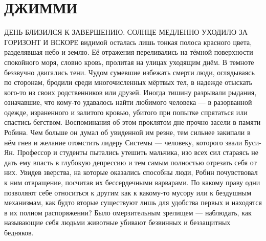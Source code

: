 \documentclass[a4paper,12pt]{book}
\begin{document}
\chapter{ДЖИММИ}
	ДЕНЬ БЛИЗИЛСЯ К ЗАВЕРШЕНИЮ. СОЛНЦЕ МЕДЛЕННО УХОДИЛО ЗА ГОРИЗОНТ И ВСКОРЕ видимой осталась лишь тонкая полоса красного цвета, разделявшая небо и землю. Её отражения переливались на тёмной поверхности спокойного моря, словно кровь, пролитая на улицах уходящим днём.
	В темноте беззвучно двигались тени. Чудом сумевшие избежать смерти люди, оглядываясь по сторонам, бродили среди многочисленных мёртвых тел, в надежде отыскать кого-то из своих родственников или друзей. Иногда тишину разрывали рыдания, означавшие, что кому-то удавалось найти любимого человека — в разорванной одежде, израненного и залитого кровью, убитого при попытке спрятаться или спастись бегством.
	Воспоминания об этом проклятом дне прочно засели в памяти Робина. Чем больше он думал об увиденной им резне, тем сильнее закипали в нём гнев и желание отомстить лидеру Системы — человеку, которого звали Буси-Ян.
	Профессор и студенты пытались утешить мальчика, изо всех сил стараясь не дать ему впасть в глубокую депрессию и тем самым полностью отрезать себя от них.
	Увидев зверства, на которые оказались способны люди, Робин почувствовал к ним отвращение, посчитав их бессердечными варварами. По какому праву одни позволяют себе относиться к другим как к какому-то мусору или к бездушным механизмам, как будто вторые существуют лишь для удобства первых и находятся в их полном распоряжении? Было омерзительным зрелищем — наблюдать, как называющие себя людьми животные убивают 
безвинных и беззащитных бедняков.
\end{document}
